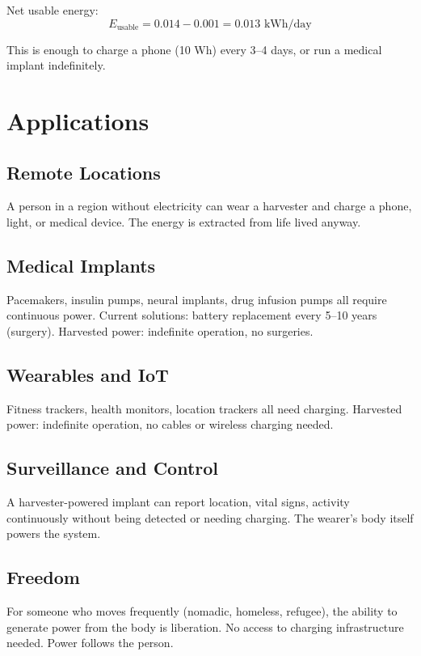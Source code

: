\documentclass[12pt]{article}
\begin{document}
Net usable energy:
\[
E_{\text{usable}} = 0.014 - 0.001 = 0.013 \text{ kWh/day}
\]

This is enough to charge a phone (10 Wh) every 3–4 days, or run a medical implant indefinitely.

\section{Applications}

\subsection{Remote Locations}

A person in a region without electricity can wear a harvester and charge a phone, light, or medical device. The energy is extracted from life lived anyway.

\subsection{Medical Implants}

Pacemakers, insulin pumps, neural implants, drug infusion pumps all require continuous power. Current solutions: battery replacement every 5–10 years (surgery). Harvested power: indefinite operation, no surgeries.

\subsection{Wearables and IoT}

Fitness trackers, health monitors, location trackers all need charging. Harvested power: indefinite operation, no cables or wireless charging needed.

\subsection{Surveillance and Control}

A harvester-powered implant can report location, vital signs, activity continuously without being detected or needing charging. The wearer's body itself powers the system.

\subsection{Freedom}

For someone who moves frequently (nomadic, homeless, refugee), the ability to generate power from the body is liberation. No access to charging infrastructure needed. Power follows the person.
\end{document}
